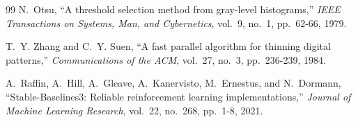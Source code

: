 \documentclass[10pt,twocolumn,twoside]{article}
\begin{document}
{\begin{thebibliography}{99}
N.~Otsu, ``A threshold selection method from gray-level histograms,''
\emph{IEEE Transactions on Systems, Man, and Cybernetics}, vol.~9, no.~1,
pp.~62-66, 1979.

T.~Y. Zhang and C.~Y. Suen, ``A fast parallel algorithm for thinning digital
patterns,'' \emph{Communications of the ACM}, vol.~27, no.~3, pp.~236-239,
1984.

A.~Raffin, A.~Hill, A.~Gleave, A.~Kanervisto, M.~Ernestus, and N.~Dormann,
``Stable-Baselines3: Reliable reinforcement learning implementations,''
\emph{Journal of Machine Learning Research}, vol.~22, no.~268, pp.~1-8, 2021.

\end{thebibliography}}
\end{document}
